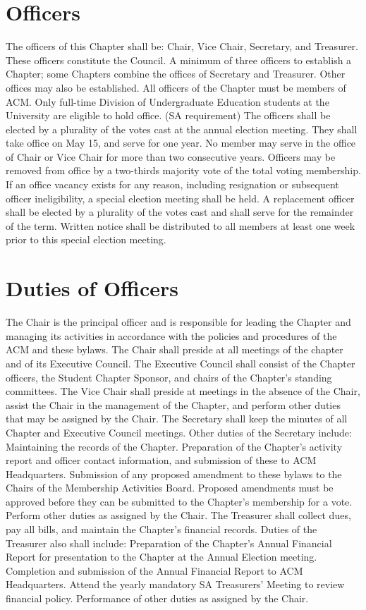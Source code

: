 \documentclass{article}
\begin{document}
\section{Officers}
The officers of this Chapter shall be: Chair, Vice Chair, Secretary, and Treasurer. These officers constitute the Council. A minimum of three officers to establish a Chapter; some Chapters combine the offices of Secretary and Treasurer. Other offices may also be established.
All officers of the Chapter must be members of ACM.
Only full-time Division of Undergraduate Education students at the University are eligible to hold office. (SA requirement)
The officers shall be elected by a plurality of the votes cast at the annual election meeting. They shall take office on May 15, and serve for one year.
No member may serve in the office of Chair or Vice Chair for more than two consecutive years.
Officers may be removed from office by a two-thirds majority vote of the total voting membership.
If an office vacancy exists for any reason, including resignation or subsequent officer ineligibility, a special election meeting shall be held. A replacement officer shall be elected by a plurality of the votes cast and shall serve for the remainder of the term. Written notice shall be distributed to all members at least one week prior to this special election meeting.

\section{Duties of Officers}
The Chair is the principal officer and is responsible for leading the Chapter and managing its activities in accordance with the policies and procedures of the ACM and these bylaws. The Chair shall preside at all meetings of the chapter and of its Executive Council. The Executive Council shall consist of the Chapter officers, the Student Chapter Sponsor, and chairs of the Chapter’s standing committees.
The Vice Chair shall preside at meetings in the absence of the Chair, assist the Chair in the management of the Chapter, and perform other duties that may be assigned by the Chair.
The Secretary shall keep the minutes of all Chapter and Executive Council meetings. Other duties of the Secretary include:
Maintaining the records of the Chapter.
Preparation of the Chapter’s activity report and officer contact information, and submission of these to ACM Headquarters.
Submission of any proposed amendment to these bylaws to the Chairs of the Membership Activities Board. Proposed amendments must be approved before they can be submitted to the Chapter’s membership for a vote.
Perform other duties as assigned by the Chair.
The Treasurer shall collect dues, pay all bills, and maintain the Chapter’s financial records. Duties of the Treasurer also shall include:
Preparation of the Chapter’s Annual Financial Report for presentation to the Chapter at the Annual Election meeting.
Completion and submission of the Annual Financial Report to ACM Headquarters.
Attend the yearly mandatory SA Treasurers’ Meeting to review financial policy.
Performance of other duties as assigned by the Chair.
\end{document}
